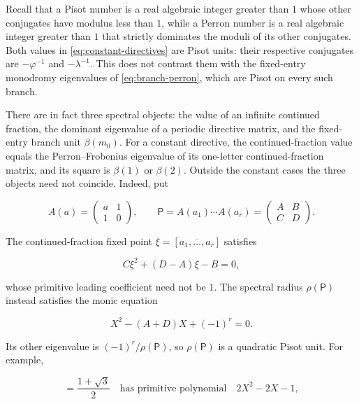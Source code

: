 Recall that a Pisot number is a real algebraic integer greater than $1$ whose
other conjugates have modulus less than $1$, while a Perron number is a real
algebraic integer greater than $1$ that strictly dominates the moduli of its
other conjugates. Both values in \cref{eq:constant-directives} are Pisot
units: their respective conjugates are $-\varphi^{-1}$ and
$-\lambda^{-1}$. This does not contrast them with the fixed-entry monodromy
eigenvalues of \cref{eq:branch-perron}, which are Pisot on every such branch.

There are in fact three spectral objects: the value of an infinite continued
fraction, the dominant eigenvalue of a periodic directive matrix, and the
fixed-entry branch unit $\beta(m_0)$. For a constant directive, the
continued-fraction value equals the Perron--Frobenius eigenvalue of its
one-letter continued-fraction matrix, and its square is $\beta(1)$ or
$\beta(2)$. Outside the constant cases the three objects need not coincide.
Indeed, put

\begin{equation}
 A(a)=\begin{pmatrix}a&1\\1&0\end{pmatrix},
 \qquad
 \mathsf P=A(a_1)\cdots A(a_r)
 =\begin{pmatrix}A&B\\C&D\end{pmatrix}.
 \label{eq:period-matrix-distinction}
\end{equation}

The continued-fraction fixed point $\xi=[\overline{a_1,\ldots,a_r}]$
satisfies

\begin{equation}
 C\xi^2+(D-A)\xi-B=0,
 \label{eq:periodic-cf-polynomial}
\end{equation}

whose primitive leading coefficient need not be $1$. The spectral radius
$\rho(\mathsf P)$ instead satisfies the monic equation

\begin{equation}
 X^2-(A+D)X+(-1)^r=0.
 \label{eq:period-matrix-polynomial}
\end{equation}

Its other eigenvalue is $(-1)^r/\rho(\mathsf P)$, so
$\rho(\mathsf P)$ is a quadratic Pisot unit. For example,

\begin{equation}
 [\overline{1,2}]=\frac{1+\sqrt3}{2}
 \quad\text{has primitive polynomial}\quad
 2X^2-2X-1,
 \label{eq:periodic-cf-distinction}
\end{equation}

